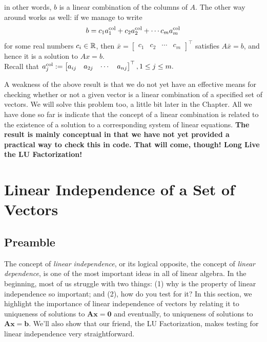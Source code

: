 \begin{tcolorbox}
\begin{equation}
\end{equation}
in other words, $b$ is a linear combination of the columns of $A$. The other way around works as well: if we manage to write 
$$b = c_1  a_1^{\rm col} + c_2 a_2^{\rm col} + \cdots c_m a_m^{\rm col}$$
for some real numbers $c_i \in \mathbb R$, then $\bar{x}=\begin{bmatrix} c_1 & c_2 & \cdots & c_m \end{bmatrix}^\top$ satisfies $A \bar{x}=b$, and hence it is a solution to $Ax=b$. \\

Recall that $a_j^{\rm col}:=\begin{bmatrix} a_{ij} & a_{2j}  & \cdots & a_{nj} \end{bmatrix}^\top, 1 \le j \le m.$
\end{tcolorbox}

A weakness of the above result is that we do not yet have an effective means for checking whether or not a given vector is a linear combination of a specified set of vectors. We will solve this problem too, a little bit later in the Chapter. All we have done so far is indicate that the concept of a linear combination is related to the existence of a solution to a corresponding system of linear equations. \textbf{The result is mainly conceptual in that we have not yet provided a practical way to check this in code. That will come, though! Long Live the LU Factorization!}


\section{Linear Independence of a Set of Vectors}

\subsection{Preamble}
The concept of \textit{linear independence}, or its logical opposite, the concept of \textit{linear dependence}, is one of the most important ideas in all of linear algebra. In the beginning, most of us struggle with two things: (1) why is the property of linear independence so important; and (2), how do you test for it? In this section, we highlight the importance of linear independence of vectors by relating it to uniqueness of solutions to $\mathbf{Ax=0}$ and eventually, to uniqueness of solutions to $\mathbf{Ax=b}$. We'll also show that our friend, the LU Factorization, makes testing for linear independence very straightforward. 

